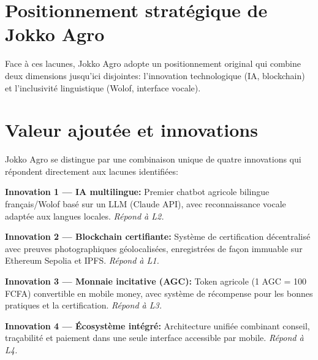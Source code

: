 \documentclass[12pt,a4paper]{report}
\begin{document}
\vspace{0.5cm}

\section{Positionnement stratégique de Jokko Agro}

\noindent
Face à ces lacunes, Jokko Agro adopte un positionnement original qui combine deux
dimensions jusqu'ici disjointes: l'innovation technologique (IA, blockchain) et
l'inclusivité linguistique (Wolof, interface vocale).

\vspace{0.4cm}

\section{Valeur ajoutée et innovations}

\noindent
Jokko Agro se distingue par une combinaison unique de quatre innovations qui répondent
directement aux lacunes identifiées:

\begin{tcolorbox}[definbox]
  \textbf{\color{bleuUniv}Innovation 1 — IA multilingue:}
  Premier chatbot agricole bilingue français/Wolof basé sur un LLM (Claude API),
  avec reconnaissance vocale adaptée aux langues locales. \textit{Répond à L2.}
\end{tcolorbox}

\vspace{0.2cm}

\begin{tcolorbox}[definbox]
  \textbf{\color{bleuUniv}Innovation 2 — Blockchain certifiante:}
  Système de certification décentralisé avec preuves photographiques géolocalisées,
  enregistrées de façon immuable sur Ethereum Sepolia et IPFS. \textit{Répond à L1.}
\end{tcolorbox}

\vspace{0.2cm}

\begin{tcolorbox}[definbox]
  \textbf{\color{bleuUniv}Innovation 3 — Monnaie incitative (AGC):}
  Token agricole (1 AGC = 100 FCFA) convertible en mobile money, avec système de
  récompense pour les bonnes pratiques et la certification. \textit{Répond à L3.}
\end{tcolorbox}

\vspace{0.2cm}

\begin{tcolorbox}[definbox]
  \textbf{\color{bleuUniv}Innovation 4 — Écosystème intégré:}
  Architecture unifiée combinant conseil, traçabilité et paiement dans une seule
  interface accessible par mobile. \textit{Répond à L4.}
\end{tcolorbox}
\end{document}
